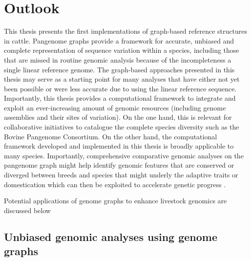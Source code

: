 \documentclass[../main.tex]{subfiles}
\begin{document}
\newpage

\section*{\LARGE{Outlook}}
{}
\thispagestyle{plain}

This thesis presents the first implementations of graph-based reference structures in cattle. Pangenome graphs provide a framework for accurate, unbiased and complete representation of sequence variation within a species, including those that are missed in routine genomic analysis because of the incompleteness a single linear reference genome. The graph-based approaches presented in this thesis may serve as a starting point for many analyses that have either not yet been possible or were less accurate due to using the linear reference sequence. Importantly, this thesis provides a computational framework to integrate and exploit an ever-increasing amount of genomic resources (including genome assemblies and their sites of variation). On the one hand, this is relevant for collaborative initiatives to catalogue the complete species diversity such as the Bovine Pangenome Consortium. On the other hand, the computational framework developed and implemented in this thesis is broadly applicable to many species. Importantly, comprehensive comparative genomic analyses on the pangenome graph might help identify genomic features that are conserved or diverged between breeds and species that might underly the adaptive traits or domestication which can then be exploited to accelerate genetic progress \citep{foissac2019multi,clark2020faang}. 

Potential applications of genome graphs to enhance livestock genomics are discussed below

\subsection*{Unbiased genomic analyses using genome graphs}
\end{document}
